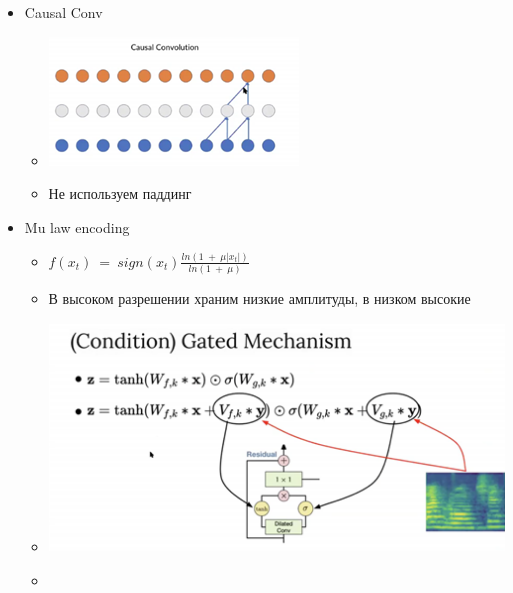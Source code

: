 \documentclass[a4paper, 12pt]{article}
\begin{document}
\begin{itemize}
\item
  
  {Causal Conv}
  

  \begin{itemize}
  \item
    
    \includegraphics[width=2.60938in,height=1.34624in]{media/image10.png}
    
  \item
    
    Не используем паддинг
    
  \end{itemize}
\item
  
  {Mu law encoding}
  

  \begin{itemize}
  \item
    
    \(f(x_{t})\  = \ sign(x_{t})\frac{ln(1\  + \ \mu|x_{t}|)}{ln(1\  + \ \mu)}\)
    
  \item
    
    В высоком разрешении храним низкие амплитуды, в низком высокие
    
  \item
    
    \includegraphics[width=4.80208in,height=2.38648in]{media/image7.png}
    
  \item
    

\end{itemize}
\end{itemize}
\end{document}
